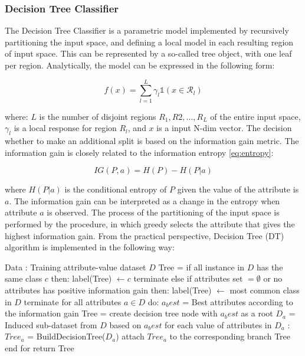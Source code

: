 \subsubsection{Decision Tree Classifier}
\label{sec:Decision_Trees}
The Decision Tree Classifier is a parametric model implemented by recursively partitioning the input space, and defining a local model in each resulting region of input space. This can be represented by a so-called tree object, with one leaf per region. 
Analytically, the model can be expressed in the following form: 

\begin{equation}
    f(x) = \sum^{L}_{l=1} \gamma_l \mathds{1}(x \in \mathcal{R}_{l})
\end{equation}

where: $L$ is the number of disjoint regions $R_{1},R{2}, \ldots, R_{L}$ of the entire input space, $\gamma_l$ is a local response for region $R_l$, and $x$ is a input N-dim vector. The decision whether to make an additional split is based on the information gain metric. The information gain is closely related to the information entropy \ref{eq:entropy}: 

\begin{equation}
    IG(P,a) = H(P) - H(P|a)
\end{equation}


where $ H(P|a)$ is the conditional entropy of $P$ given the value of the attribute is $a$. The information gain can be interpreted as a change in the entropy when attribute $a$ is observed. The process of the partitioning of the input space is performed by the procedure, in which greedy selects the attribute that gives the highest information gain. 
From the practical perspective, Decision Tree (DT) algorithm is implemented in the following way:

\begin{algorithm}[caption={Building Decision Tree (psudocode)}, label={DTAlgorithm}]
Data : Training attribute-value dataset $D$
Tree = {}
if all instance in $D$ has the same class $c$ then:
   label(Tree) $\leftarrow c$ 
   terminate
else if attributes set $= \emptyset$ or no attributes has positive information gain then:
   label(Tree) $\leftarrow $ most common class in $D$
   terminate
for all attributes $a \in D$ do:
   $a_best$ = Best attributes according to the information gain
   Tree = create decision tree node with $a_best$ as a root
   $D_a$ = Induced sub-dataset from $D$ based on $a_best$
   for each value of attributes in $D_a$ :
      $Tree_{a}$ = BuildDecisionTree($D_a$)
      attach  $Tree_{a}$  to the corresponding branch Tree
end for
return Tree
\end{algorithm}

